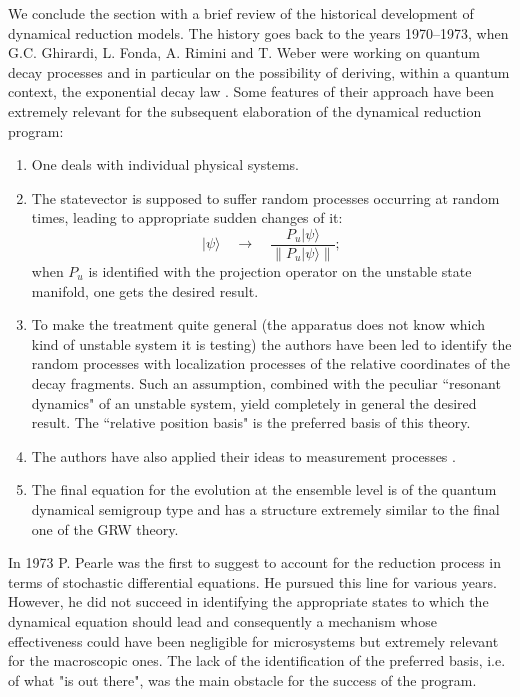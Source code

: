 \documentclass[10pt,a4paper]{article}
\begin{document}
We conclude the section with a brief review of the historical
development of dynamical reduction models. The history goes back
to the years 1970--1973, when G.C. Ghirardi, L. Fonda, A. Rimini and
T. Weber were working on quantum decay processes and in particular
on the possibility of deriving, within a quantum context, the
exponential decay law \cite{fons1,fons2}. Some features of their
approach have been extremely relevant for the subsequent elaboration of
the dynamical reduction program:
\begin{enumerate}
\item One deals with individual physical systems.
\item The statevector is supposed to suffer random processes
occurring at random times, leading to appropriate sudden changes
of it:
\[
|\psi\rangle \quad\longrightarrow\quad \frac{P_{u}|\psi
\rangle}{\|P_{u}|\psi\rangle\|};
\]
when $P_{u}$ is identified with the projection operator on the
unstable state manifold, one gets the desired result.
\item To make the treatment quite general (the apparatus does not
know which kind of unstable system it is testing) the authors have
been led to identify  the random processes with localization
processes of the relative coordinates of the decay fragments. Such
an assumption, combined with the peculiar ``resonant dynamics" of
an unstable system, yield completely in general the desired
result. The ``relative position basis" is the preferred basis of
this theory.
\item The authors have also applied their ideas to measurement
processes \cite{fons3}.
\item The final equation for the evolution at the ensemble level
is of the quantum dynamical semigroup type \cite{lin,gli} and has
a structure extremely similar to the final one of the GRW theory.
\end{enumerate}

In 1973 P. Pearle was the first to suggest to account for the
reduction process in terms of stochastic differential equations.
He pursued this line for various years. However, he did not
succeed in identifying the appropriate states to which the
dynamical equation should lead and consequently a mechanism whose
effectiveness could have been negligible for microsystems but
extremely relevant for the macroscopic ones. The lack of the
identification of the preferred basis, i.e. of what "is out
there", was the main obstacle for the success of the program.
\end{document}
